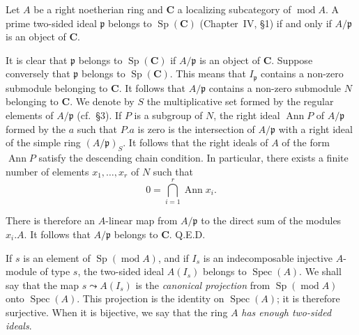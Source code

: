 \begin{proposition}
Let $A$ be a right noetherian ring and $\mathbf{C}$ a localizing
subcategory of $\operatorname{mod} A$. A prime two-sided ideal
$\mathfrak{p}$ belongs to $\operatorname{Sp}(\mathbf{C})$
(Chapter~IV, \S1) if and only if $A/\mathfrak{p}$ is an object of
$\mathbf{C}$.
\end{proposition}

It is clear that $\mathfrak{p}$ belongs to
$\operatorname{Sp}(\mathbf{C})$ if $A/\mathfrak{p}$ is an object of
$\mathbf{C}$. Suppose conversely that $\mathfrak{p}$ belongs to
$\operatorname{Sp}(\mathbf{C})$. This means that $I_{\mathfrak{p}}$
contains a non-zero submodule belonging to $\mathbf{C}$. It follows that
$A/\mathfrak{p}$ contains a non-zero submodule $N$ belonging to
$\mathbf{C}$. We denote by $S$ the multiplicative set formed by the
regular elements of $A/\mathfrak{p}$ (cf.~\S3). If $P$ is a subgroup of
$N$, the right ideal $\operatorname{Ann} P$ of $A/\mathfrak{p}$ formed by
the $a$ such that $P.a$ is zero is the intersection of $A/\mathfrak{p}$
with a right ideal of the simple ring $(A/\mathfrak{p})_S$. It follows
that the right ideals of $A$ of the form $\operatorname{Ann} P$ satisfy
the descending chain condition. In particular, there exists a finite
number of elements $x_1, \ldots, x_r$ of $N$ such that
\[
0 = \bigcap_{i=1}^{r} \operatorname{Ann} x_i.
\]

There is therefore an $A$-linear map from $A/\mathfrak{p}$ to the direct
sum of the modules $x_i.A$. It follows that $A/\mathfrak{p}$ belongs to
$\mathbf{C}$. \hfill Q.E.D.

If $s$ is an element of $\operatorname{Sp}(\operatorname{mod} A)$, and if
$I_s$ is an indecomposable injective $A$-module of type $s$, the
two-sided ideal $A(I_s)$ belongs to $\operatorname{Spec}(A)$. We shall
say that the map $s \leadsto A(I_s)$ is the \emph{canonical projection}
from $\operatorname{Sp}(\operatorname{mod} A)$ onto
$\operatorname{Spec}(A)$. This projection is the identity on
$\operatorname{Spec}(A)$; it is therefore surjective. When it is
bijective, we say that the ring $A$ \emph{has enough two-sided ideals}.

